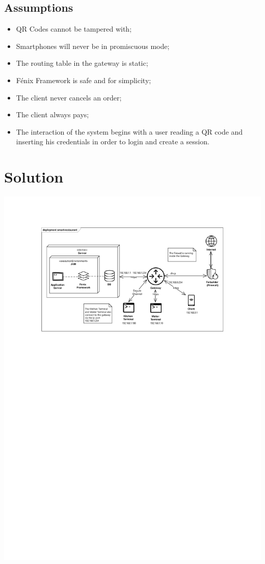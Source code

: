 \documentclass[12pt,paper=a4]{article}
\begin{document}
\subsection{Assumptions}
\begin{itemize}
\item QR Codes cannot be tampered with;
\item Smartphones will never be in promiscuous mode; 
\item The routing table in the gateway is static; 
\item Fénix Framework is safe and for simplicity;
\item The client never cancels an order;
\item The client always pays;
\item The interaction of the system begins with a user reading a QR code and inserting his credentials in order to login and create a session.
\end{itemize}
\section{Solution}

\includegraphics[trim=3.8cm 18cm 0 2cm]{Diagrama.pdf}
\end{document}
